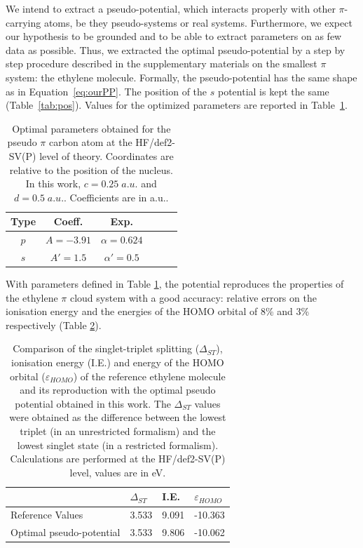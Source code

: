 \documentclass[aip]{revtex4-1}
\begin{document}
We intend to extract a pseudo-potential, which interacts properly with 
other $\pi$-carrying atoms, be they pseudo-systems or real systems.
Furthermore, we expect our hypothesis to be grounded and to be able to
extract parameters on as few data as possible.
Thus, we extracted the optimal pseudo-potential by a step by step procedure described in 
the supplementary materials on the smallest $\pi$ system: the ethylene molecule.
Formally, the pseudo-potential has the same shape as in Equation~\ref{eq:ourPP}.
The position of the $s$ potential is kept the same (Table~\ref{tab:pos}). 
Values for the optimized parameters are reported in Table~\ref{tab:params}.
\begin{table}[ht]
\caption{\label{tab:params}Optimal parameters obtained for the pseudo 
$\pi$ carbon atom at the HF/def2-SV(P) level of theory.
Coordinates are relative to the position of the nucleus.
In this work, $c=0.25\;a.u.$ and $d=0.5\;a.u.$.
Coefficients are in a.u..
}
\begin{tabular}{ccccrr}
\hline\hline
Type &  Coeff. & Exp. \\
\hline
$p$  & $A=-3.91$ & $\alpha=0.624$ \\
$s$  & $A'=1.5$   & $\alpha'=0.5$   \\
\hline\hline
\end{tabular}
\end{table}

With parameters defined in Table \ref{tab:params}, the potential reproduces the properties
of the ethylene $\pi$ cloud system with a good accuracy: relative errors on the ionisation
energy and the energies of the HOMO orbital of 8\% and 3\% respectively (Table \ref{tab:res_ourPP}).

\begin{table}[ht]
\caption{\label{tab:res_ourPP}Comparison of the
singlet-triplet splitting ($\Delta_{ST}$), ionisation
energy (I.E.) and energy of the HOMO orbital ($\varepsilon_{HOMO}$)
of the reference ethylene molecule
and its reproduction with the optimal pseudo potential obtained in this work.
The $\Delta_{ST}$ values were obtained as the difference
between the lowest triplet (in an unrestricted formalism) and the lowest singlet state
(in a restricted formalism).
Calculations are performed at the HF/def2-SV(P) level, values are in eV.}
\begin{tabular}{llll}
\hline\hline
& $\Delta_{ST}$  & I.E.  & $\varepsilon_{HOMO}$  \\
\hline
Reference Values & 3.533 & 9.091 & -10.363 \\
Optimal pseudo-potential & 3.533 & 9.806 & -10.062 \\
\hline\hline
\end{tabular}
\end{table}
\end{document}
